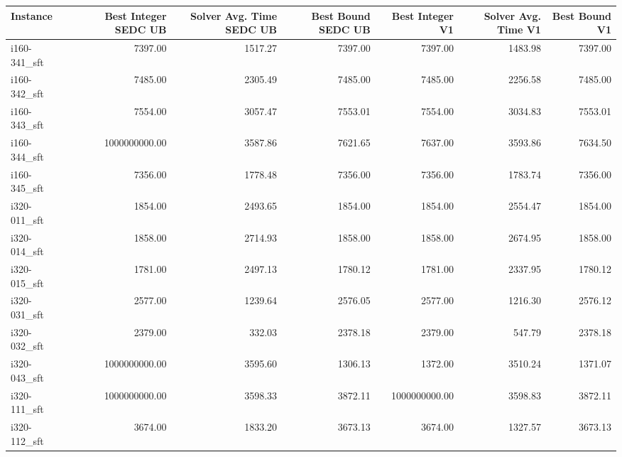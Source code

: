 \begin{tabular}{lrrrrrr}
\toprule
Instance &  Best Integer SEDC UB &  Solver Avg. Time SEDC UB &  Best Bound SEDC UB &  Best Integer V1 &  Solver Avg. Time V1 &  Best Bound V1 \\
\midrule
i160-341\_sft &            7397.00 &                1517.27 &          7397.00 &          7397.00 &              1483.98 &        7397.00 \\
i160-342\_sft &            7485.00 &                2305.49 &          7485.00 &          7485.00 &              2256.58 &        7485.00 \\
i160-343\_sft &            7554.00 &                3057.47 &          7553.01 &          7554.00 &              3034.83 &        7553.01 \\
i160-344\_sft &      1000000000.00 &                3587.86 &          7621.65 &          7637.00 &              3593.86 &        7634.50 \\
i160-345\_sft &            7356.00 &                1778.48 &          7356.00 &          7356.00 &              1783.74 &        7356.00 \\
i320-011\_sft &            1854.00 &                2493.65 &          1854.00 &          1854.00 &              2554.47 &        1854.00 \\
i320-014\_sft &            1858.00 &                2714.93 &          1858.00 &          1858.00 &              2674.95 &        1858.00 \\
i320-015\_sft &            1781.00 &                2497.13 &          1780.12 &          1781.00 &              2337.95 &        1780.12 \\
i320-031\_sft &            2577.00 &                1239.64 &          2576.05 &          2577.00 &              1216.30 &        2576.12 \\
i320-032\_sft &            2379.00 &                 332.03 &          2378.18 &          2379.00 &               547.79 &        2378.18 \\
i320-043\_sft &      1000000000.00 &                3595.60 &          1306.13 &          1372.00 &              3510.24 &        1371.07 \\
i320-111\_sft &      1000000000.00 &                3598.33 &          3872.11 &    1000000000.00 &              3598.83 &        3872.11 \\
i320-112\_sft &            3674.00 &                1833.20 &          3673.13 &          3674.00 &              1327.57 &        3673.13 \\

\end{tabular}
